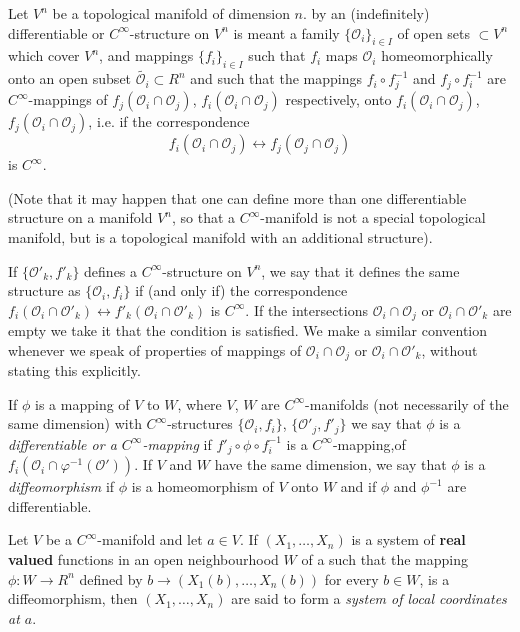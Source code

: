 \medskip
{}
Let $V^n$ be a topological manifold of dimension $n$. by an
(indefinitely) differentiable or $C^\infty$-structure on $V^n$ is
meant a family $\{\mathscr{O}_i\}_{i\in I}$ of open sets $\subset V^n$
which cover $V^n$, and mappings $\{f_i\}_{i\in I}$ such that $f_i$
maps $\mathscr{O}_i$ homeomorphically onto an open subset
$\tilde{\mathscr{O}_i} \subset R^n$ and such that the mappings $f_i
\circ f^{-1}_j$ and $f_j \circ f^{-1}_i$ are $C^\infty$-mappings of
$f_j(\mathscr{O}_i \cap \mathscr{O}_j)$, $f_i(\mathscr{O}_i \cap
\mathscr{O}_j)$  respectively, onto $f_i (\mathscr{O}_i \cap
\mathscr{O}_j)$, $f_j(\mathscr{O}_i \cap \mathscr{O}_j)$, i.e. if the
correspondence 
$$
f_i (\mathscr{O}_i \cap \mathscr{O}_j) \longleftrightarrow f_j
(\mathscr{O}_j \cap \mathscr{O}_j)
$$
is $C^\infty$.

(Note that it may happen that one can define more than one
differentiable structure on a manifold $V^n$, so that a
$C^\infty$-manifold is not a special topological manifold, but is a
topological manifold with an additional structure).

If $\{\mathscr{O}'_k, f'_k\}$ defines a $C^\infty$-structure on $V^n$,
we say that it defines the same structure as $\{\mathscr{O}_i, f_i\}$
if (and only if) the correspondence $f_i (\mathscr{O}_i \cap
\mathscr{O}'_k) \longleftrightarrow f'_k (\mathscr{O}_i \cap
\mathscr{O}'_k)$ is $C^\infty$. If the intersections $\mathscr{O}_i
\cap \mathscr{O}_j$ or $\mathscr{O}_i \cap \mathscr{O}'_k$ are empty
we take it that the condition is satisfied. We make a similar
convention whenever we speak of properties of mappings of
$\mathscr{O}_i \cap \mathscr{O}_j$ or $\mathscr{O}_i \cap
\mathscr{O}'_k$, without stating this explicitly.

If $\phi$ is a mapping of $V$ to $W$, where $V$, $W$ are
$C^\infty$-manifolds (not necessarily of the same dimension) with
$C^\infty$-structures $\{\mathscr{O}_i , f_i\}$, $\{\mathscr{O}'_j,
f'_j\}$ we say that $\phi $ is a \textit{differentiable or a
  $C^\infty$-mapping} if $f'_j \circ\phi \circ f^{-1}_i$ is a
$C^\infty$-mapping,\pageoriginale of $f_i (\mathscr{O}_i \cap
\varphi^{-1} (\mathscr{O}'))$. If $V$ and $W$ have the same dimension,
we say that $\phi$ is a \textit{diffeomorphism} if $\phi$ is a
homeomorphism of $V$ onto $W$ and if $\phi$ and $\phi^{-1}$ are
differentiable. 

\medskip
{}

\begin{defi*}
Let $V$ be a $C^\infty$-manifold and let $a\in V$. If $(X_1, \ldots,
X_n)$ is a system of \textbf{real valued} functions in an open
neighbourhood $W$ of a such that the mapping $\phi:W \to R^n$ defined
by $b \to (X_1 (b), \ldots, X_n (b))$ for every $b\in W$, is a
diffeomorphism, then $(X_1, \ldots, X_n)$ are said to form a
\textit{system of local coordinates at $a$}.
\end{defi*}


